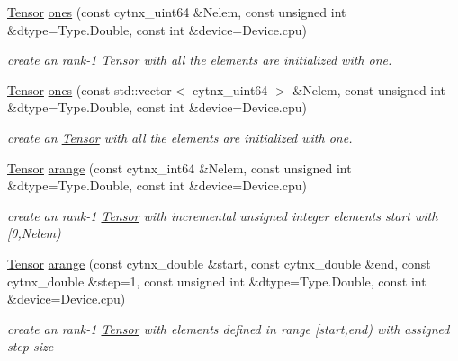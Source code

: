 \textbf{ }\par
\begin{DoxyCompactItemize}
\item 
\hyperlink{classcytnx_1_1Tensor}{Tensor} \hyperlink{namespacecytnx_a83fb7bbe73368751a0d0f535d4a10a33}{ones} (const cytnx\+\_\+uint64 \&Nelem, const unsigned int \&dtype=Type.\+Double, const int \&device=Device.\+cpu)
\begin{DoxyCompactList}\small\item\em create an rank-\/1 \hyperlink{classcytnx_1_1Tensor}{Tensor} with all the elements are initialized with one. \end{DoxyCompactList}\item 
\hyperlink{classcytnx_1_1Tensor}{Tensor} \hyperlink{namespacecytnx_a8e80968b20c01c839ea854c398c88ac1}{ones} (const std\+::vector$<$ cytnx\+\_\+uint64 $>$ \&Nelem, const unsigned int \&dtype=Type.\+Double, const int \&device=Device.\+cpu)
\begin{DoxyCompactList}\small\item\em create an \hyperlink{classcytnx_1_1Tensor}{Tensor} with all the elements are initialized with one. \end{DoxyCompactList}\end{DoxyCompactItemize}

\textbf{ }\par
\begin{DoxyCompactItemize}
\item 
\hyperlink{classcytnx_1_1Tensor}{Tensor} \hyperlink{namespacecytnx_a733f9931141463bc8b7c61931ccf52c3}{arange} (const cytnx\+\_\+int64 \&Nelem, const unsigned int \&dtype=Type.\+Double, const int \&device=Device.\+cpu)
\begin{DoxyCompactList}\small\item\em create an rank-\/1 \hyperlink{classcytnx_1_1Tensor}{Tensor} with incremental unsigned integer elements start with \mbox{[}0,Nelem) \end{DoxyCompactList}\item 
\hyperlink{classcytnx_1_1Tensor}{Tensor} \hyperlink{namespacecytnx_add9038b2dc354c3123dc56d5912430e0}{arange} (const cytnx\+\_\+double \&start, const cytnx\+\_\+double \&end, const cytnx\+\_\+double \&step=1, const unsigned int \&dtype=Type.\+Double, const int \&device=Device.\+cpu)
\begin{DoxyCompactList}\small\item\em create an rank-\/1 \hyperlink{classcytnx_1_1Tensor}{Tensor} with elements defined in range \mbox{[}start,end) with assigned step-\/size \end{DoxyCompactList}\end{DoxyCompactItemize}

